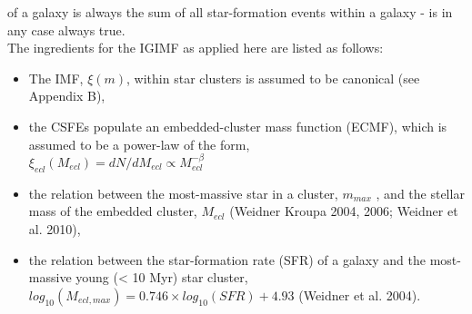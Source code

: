 of a galaxy is always the sum of all star-formation events within a galaxy - is in any case always true.
\\
The ingredients for the IGIMF as applied here are listed as follows:
\begin{itemize}
	\item The IMF, $\xi(m)$, within star clusters is assumed to be canonical (see Appendix B),
	\item the CSFEs populate an embedded-cluster mass function (ECMF), which is assumed to be a power-law of the form,\\
		$\xi_{ecl}(M_{ecl}) = dN/dM_{ecl} \propto M_{ecl}^{-\beta}$
	\item the relation between the most-massive star in a cluster, $m_{max}$ , and the stellar mass of the embedded cluster, $M_{ecl}$
	(Weidner Kroupa 2004, 2006; Weidner et al. 2010),
	\item the relation between the star-formation rate (SFR) of a galaxy and the most-massive young (< 10 Myr) star cluster,
	$log_{10} (M_{ecl,max} ) = 0.746 \times log_{10}(SF R) + 4.93$ (Weidner et al. 2004).
	
\end{itemize}
